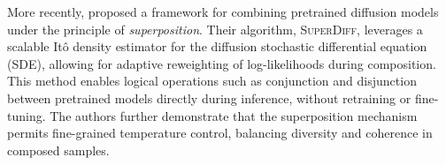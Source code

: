 
More recently, \citet{skreta2024superposition} proposed a framework for combining pretrained diffusion models under the principle of \emph{superposition}.  
Their algorithm, \textsc{SuperDiff}, leverages a scalable Itô density estimator for the diffusion stochastic differential equation (SDE), allowing for adaptive reweighting of log-likelihoods during composition.  
This method enables logical operations such as conjunction and disjunction between pretrained models directly during inference, without retraining or fine-tuning.  
The authors further demonstrate that the superposition mechanism permits fine-grained temperature control, balancing diversity and coherence in composed samples.  



